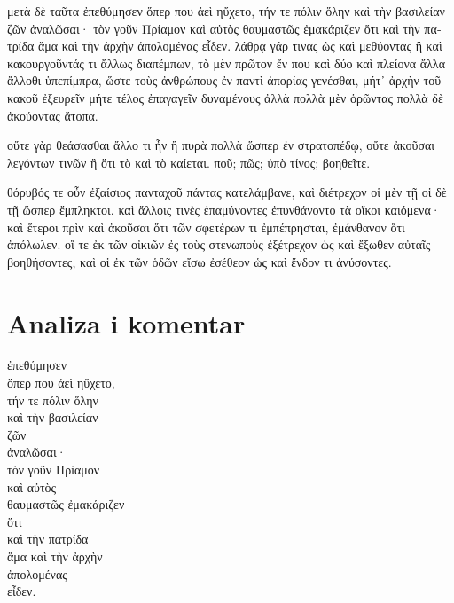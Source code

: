 {\large

\begin{greek}

\noindent μετὰ δὲ ταῦτα ἐπεθύμησεν ὅπερ που ἀεὶ ηὔχετο, τήν τε πόλιν ὅλην καὶ τὴν βασιλείαν ζῶν ἀναλῶσαι· τὸν γοῦν Πρίαμον καὶ αὐτὸς θαυμαστῶς ἐμακάριζεν ὅτι καὶ τὴν πατρίδα ἅμα καὶ τὴν ἀρχὴν ἀπολομένας εἶδεν. λάθρᾳ γάρ τινας ὡς καὶ μεθύοντας ἢ καὶ κακουργοῦντάς τι ἄλλως διαπέμπων, τὸ μὲν πρῶτον ἕν που καὶ δύο καὶ πλείονα ἄλλα ἄλλοθι ὑπεπίμπρα, ὥστε τοὺς ἀνθρώπους ἐν παντὶ ἀπορίας γενέσθαι, μήτ᾽ ἀρχὴν τοῦ κακοῦ ἐξευρεῖν μήτε τέλος ἐπαγαγεῖν δυναμένους ἀλλὰ πολλὰ μὲν ὁρῶντας πολλὰ δὲ ἀκούοντας ἄτοπα. 

\noindent οὔτε γὰρ θεάσασθαι ἄλλο τι ἦν ἢ πυρὰ πολλὰ ὥσπερ ἐν στρατοπέδῳ, οὔτε ἀκοῦσαι λεγόντων τινῶν ἢ ὅτι τὸ καὶ τὸ καίεται. ποῦ; πῶς; ὑπὸ τίνος; βοηθεῖτε.

\noindent θόρυβός τε οὖν ἐξαίσιος πανταχοῦ πάντας κατελάμβανε, καὶ διέτρεχον οἱ μὲν τῇ οἱ δὲ τῇ ὥσπερ ἔμπληκτοι. καὶ ἄλλοις τινὲς ἐπαμύνοντες ἐπυνθάνοντο τὰ οἴκοι καιόμενα· καὶ ἕτεροι πρὶν καὶ ἀκοῦσαι ὅτι τῶν σφετέρων τι ἐμπέπρησται, ἐμάνθανον ὅτι ἀπόλωλεν. οἵ τε ἐκ τῶν οἰκιῶν ἐς τοὺς στενωποὺς ἐξέτρεχον ὡς καὶ ἔξωθεν αὐταῖς βοηθήσοντες, καὶ οἱ ἐκ τῶν ὁδῶν εἴσω ἐσέθεον ὡς καὶ ἔνδον τι ἀνύσοντες.

\end{greek}

}


\section*{Analiza i komentar}


{\large
\begin{greek}
\noindent ἐπεθύμησεν \\
\tabto{2em} ὅπερ που ἀεὶ ηὔχετο, \\
τήν τε πόλιν ὅλην \\
καὶ τὴν βασιλείαν \\
ζῶν \\
\tabto{2em} ἀναλῶσαι· \\
τὸν γοῦν Πρίαμον \\
καὶ αὐτὸς \\
θαυμαστῶς ἐμακάριζεν \\
\tabto{2em} ὅτι \\
\tabto{4em} καὶ τὴν πατρίδα \\
\tabto{4em} ἅμα καὶ τὴν ἀρχὴν \\
\tabto{4em} ἀπολομένας \\
\tabto{4em} εἶδεν. \\

\end{greek}
}

